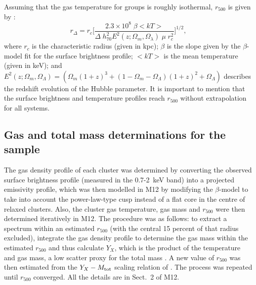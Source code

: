 \documentclass{aa}
\begin{document}
Assuming that the gas temperature for groups is roughly isothermal,
$r_{500}$ is given by \citet{LN03}:
\begin{equation}
\label{detr500}
r_{\Delta}=r_{c} \big[\frac{2.3 \times 10^{8} \; \beta <kT>}{\Delta \; h_{70}^{2} E^{2}(z;\Omega_{m}, 
\Omega_{\lambda}) \;  \mu \; r_{c}^{2}}\big]^{1/2},
\end{equation}
where $r_{c}$ is the characteristic radius (given in kpc);  $\beta$ is  
the slope given by the $\beta$-model fit for the surface brightness profile;  $<kT>$ is the mean
temperature (given in keV); and 
$E^{2}(z;\Omega_{m}, \Omega_{\Lambda}) = (\Omega_{m}(1+z)^{3} + (1-\Omega_{m}-\Omega_{\Lambda})(1+z)^{2} + 
\Omega_{\Lambda})$
describes the redshift evolution of the Hubble parameter.
It is important to mention that  the surface brightness and temperature profiles 
reach $r_{500}$ without extrapolation for all systems. 



\subsection{Gas and total mass determinations for the \citet{M12} sample}

The gas density profile of each cluster was determined by converting
the observed surface brightness profile (measured in the 0.7-2~keV
band) into a projected emissivity profile, which was then modelled in
M12 by modifying the $\beta$-model \citep[see
e.g.,][]{pointec04,V06,M08} to take into account the
power-law-type cusp instead of a flat core in the centre of relaxed
clusters.
Also, the cluster gas temperature, gas mass and $r_{500}$ were
then determined iteratively in M12.  The procedure was as follows:   to extract a
spectrum within an estimated $r_{500}$ (with the central 15 percent
of that radius excluded), integrate the gas density profile to
determine the gas mass within the estimated $r_{500}$ and thus
calculate $Y_{X}$, which is the product of the temperature and gas mass,
 a low scatter proxy for the total mass \citep{kravtsov06}.  A new
value of $r_{500}$ was then estimated from the $Y_{X} - M_{\rm tot}$
scaling relation of \citet{V09}.  The process was repeated until
$r_{500}$ converged. All the details are in Sect.~2 of M12.
\end{document}
